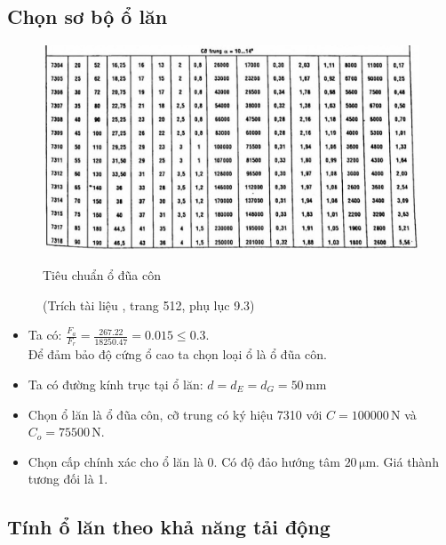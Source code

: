         \subsection{Chọn sơ bộ ổ lăn}
            \begin{figure}[H]
                \centering
                \includegraphics[width=1\textwidth]{pictures/bearing_standard_III.png}
                \caption{Tiêu chuẩn ổ đũa côn}
                \caption*{\footnotesize(Trích tài liệu \cite{btctm}, trang 512, phụ lục 9.3)}
            \end{figure}
            \begin{itemize}
                \item Ta có: $\frac{F_a}{F_r} = \frac{267.22}{18250.47} = 0.015 \leq 0.3$. \\[0.3cm]
                Để đảm bảo độ cứng ổ cao ta chọn loại ổ là ổ đũa côn.
                \item Ta có đường kính trục tại ổ lăn: $d = d_{E} = d_{G} = 50\, \mathrm{mm}$
                \item Chọn ổ lăn là ổ đũa côn, cỡ trung có ký hiệu 7310 với $C = 100000\, \mathrm{N}$ và $C_o = 75500\, \mathrm{N}$.
                \item Chọn cấp chính xác cho ổ lăn là 0. Có độ đảo hướng tâm $20\, \mathrm{\mu m}$. Giá thành tương đối là 1.
            \end{itemize}
        \subsection{Tính ổ lăn theo khả năng tải động}
